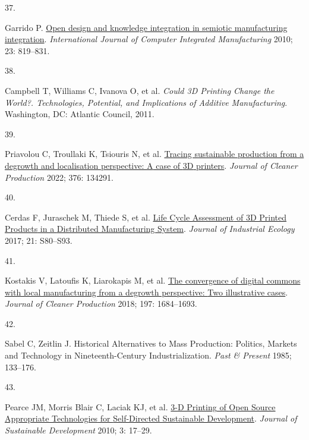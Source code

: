 \documentclass[
  12pt,
  a4paperpaper,
  onecolumn]{article}
\newlength{\cslhangindent}
\newlength{\csllabelwidth}
\newlength{\cslentryspacingunit} %
\newenvironment{CSLReferences}[2] %
 {%
  \setlength{\parindent}{0pt}
  \ifodd #1
  \let\oldpar\par
  \def\par{\hangindent=\cslhangindent\oldpar}
  \fi
  \setlength{\parskip}{#2\cslentryspacingunit}
 }%
 {}
\newcommand{\CSLLeftMargin}[1]{\parbox[t]{\csllabelwidth}{#1}}
\newcommand{\CSLRightInline}[1]{\parbox[t]{\linewidth - \csllabelwidth}{#1}\break}
\begin{document}
\begin{CSLReferences}{0}{0}
\leavevmode{}%
\CSLLeftMargin{37. }%
\CSLRightInline{Garrido P.
\href{https://doi.org/10.1080/0951192X.2010.490923}{Open design and
knowledge integration in semiotic manufacturing integration}.
\emph{International Journal of Computer Integrated Manufacturing} 2010;
23: 819--831.}

\leavevmode{}%
\CSLLeftMargin{38. }%
\CSLRightInline{Campbell T, Williams C, Ivanova O, et al. \emph{Could
{3D Printing Change} the {World}?. {Technologies}, {Potential}, and
{Implications} of {Additive Manufacturing}}. {Washington, DC}: {Atlantic
Council}, 2011.}

\leavevmode{}%
\CSLLeftMargin{39. }%
\CSLRightInline{Priavolou C, Troullaki K, Tsiouris N, et al.
\href{https://doi.org/10.1016/j.jclepro.2022.134291}{Tracing sustainable
production from a degrowth and localisation perspective: {A} case of
{3D} printers}. \emph{Journal of Cleaner Production} 2022; 376: 134291.}

\leavevmode{}%
\CSLLeftMargin{40. }%
\CSLRightInline{Cerdas F, Juraschek M, Thiede S, et al.
\href{https://doi.org/10.1111/jiec.12618}{Life {Cycle Assessment} of {3D
Printed Products} in a {Distributed Manufacturing System}}.
\emph{Journal of Industrial Ecology} 2017; 21: S80--S93.}

\leavevmode{}%
\CSLLeftMargin{41. }%
\CSLRightInline{Kostakis V, Latoufis K, Liarokapis M, et al.
\href{https://doi.org/10.1016/j.jclepro.2016.09.077}{The convergence of
digital commons with local manufacturing from a degrowth perspective:
{Two} illustrative cases}. \emph{Journal of Cleaner Production} 2018;
197: 1684--1693.}

\leavevmode{}%
\CSLLeftMargin{42. }%
\CSLRightInline{Sabel C, Zeitlin J. Historical {Alternatives} to {Mass
Production}: {Politics}, {Markets} and {Technology} in
{Nineteenth-Century Industrialization}. \emph{Past \& Present} 1985;
133--176.}

\leavevmode{}%
\CSLLeftMargin{43. }%
\CSLRightInline{Pearce JM, Morris Blair C, Laciak KJ, et al.
\href{https://doi.org/10.5539/jsd.v3n4p17}{3-{D Printing} of {Open
Source Appropriate Technologies} for {Self-Directed Sustainable
Development}}. \emph{Journal of Sustainable Development} 2010; 3:
17--29.}


\end{CSLReferences}
\end{document}
